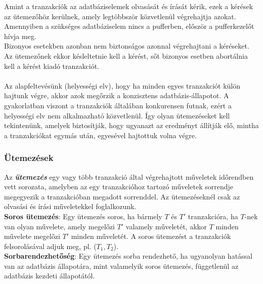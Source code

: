 \documentclass[12pt,margin=0px]{article}
\begin{document}
    \noindent Amint a tranzakciók az adatbáziselemek olvasását és írását kérik, ezek a kérések az ütemezőhöz kerülnek, amely legtöbbször közvetlenül végrehajtja azokat. Amennyiben a szükséges adatbáziselem nincs a pufferben, először a pufferkezelőt hívja meg.\\
    Bizonyos esetekben azonban nem biztonságos azonnal végrehajtani a kéréseket. Az ütemezőnek ekkor késleltetnie kell a kérést, sőt bizonyos esetben abortálnia kell a kérést kiadó tranzakciót. \\\\
	Az alapfeltevésünk (helyességi elv), hogy ha minden egyes tranzakciót külön hajtunk végre, akkor azok megőrzik a konzisztens
	adatbázis-állapotot. A gyakorlatban viszont a tranzakciók általában konkurensen futnak, ezért a helyességi elv nem
	alkalmazható közvetlenül. Így olyan ütemezéseket kell tekintenünk, amelyek biztosítják, hogy ugyanazt az eredményt állítják elő,
	mintha a tranzakciókat egymás után, egyesével hajtottuk volna végre.
	
	\subsubsection*{Ütemezések}
	
    \noindent Az \emph{\textbf{ütemezés}} egy vagy több tranzakció által végrehajtott műveletek időrendben vett sorozata, amelyben az egy tranzakcióhoz tartozó műveletek sorrendje megegyezik a tranzakcióban megadott sorrenddel. Az ütemezéseknél csak az olvasási és írási műveletekkel foglalkozunk.\\
	
	\noindent \textbf{Soros ütemezés}: Egy ütemezés soros, ha bármely $T$ és $T'$ tranzakcióra, ha $T$-nek van olyan művelete, amely
	megelőzi $T'$ valamely műveletét, akkor $T$ minden művelete megelőzi $T'$ minden műveletét. A soros ütemezést a tranzakciók
	felsorolásával adjuk meg, pl. ($T_{1},T_{2}$).\\
	
	\noindent \textbf{Sorbarendezhetőség}: Egy ütemezés sorba rendezhető, ha ugyanolyan hatással van az adatbázis állapotára,
	mint valamelyik soros ütemezés, függetlenül az adatbázis kezdeti állapotától.\\
	
\end{document}
